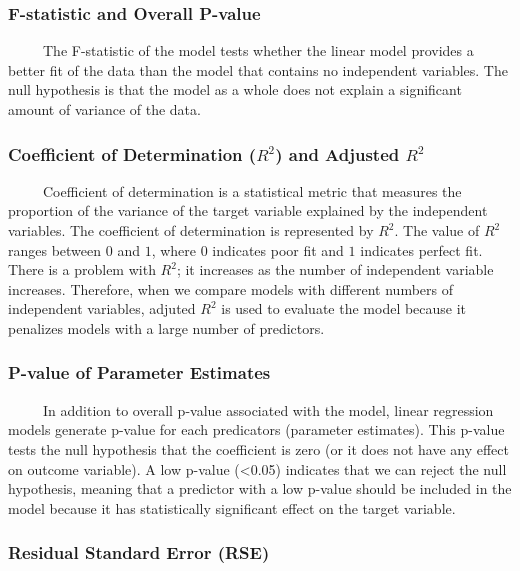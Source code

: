 \documentclass[
  letterpaper,
  DIV=11,
  numbers=noendperiod]{scrreprt}
\begin{document}
\subsubsection{F-statistic and Overall
P-value}\label{f-statistic-and-overall-p-value}

~~~~~The F-statistic of the model tests whether the linear model
provides a better fit of the data than the model that contains no
independent variables. The null hypothesis is that the model as a whole
does not explain a significant amount of variance of the data.

\subsubsection{\texorpdfstring{Coefficient of Determination (\(R^2\))
and Adjusted
\(R^2\)}{Coefficient of Determination (R\^{}2) and Adjusted R\^{}2}}\label{coefficient-of-determination-r2-and-adjusted-r2}

~~~~~Coefficient of determination is a statistical metric that measures
the proportion of the variance of the target variable explained by the
independent variables. The coefficient of determination is represented
by \(R^2\). The value of \(R^2\) ranges between \(0\) and \(1\), where
\(0\) indicates poor fit and \(1\) indicates perfect fit. There is a
problem with \(R^2\); it increases as the number of independent variable
increases. Therefore, when we compare models with different numbers of
independent variables, adjuted \(R^2\) is used to evaluate the model
because it penalizes models with a large number of predictors.

\subsubsection{P-value of Parameter
Estimates}\label{p-value-of-parameter-estimates}

~~~~~In addition to overall p-value associated with the model, linear
regression models generate p-value for each predicators (parameter
estimates). This p-value tests the null hypothesis that the coefficient
is zero (or it does not have any effect on outcome variable). A low
p-value (\textless0.05) indicates that we can reject the null
hypothesis, meaning that a predictor with a low p-value should be
included in the model because it has statistically significant effect on
the target variable.

\subsubsection{Residual Standard Error
(RSE)}\label{residual-standard-error-rse}
\end{document}
